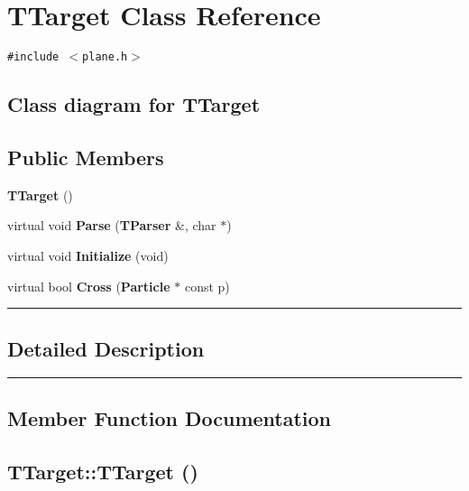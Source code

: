 \section{TTarget  Class Reference}
\label{TTarget}


{\tt \#include $<$plane.h$>$}

\subsection*{Class diagram for TTarget}
\begin{figure}[H]
\begin{center}
\leavevmode
\setlength{\epsfysize}{3cm}
\end{center}
\end{figure}
\subsection*{Public Members}
\begin{CompactItemize}
\item 
{\bf TTarget} ()
\item 
virtual void {\bf Parse} ({\bf TParser} \&, char $\ast$)
\item 
virtual void {\bf Initialize} (void)
\item 
virtual bool {\bf Cross} ({\bf Particle} $\ast$ const p)
\end{CompactItemize}
\vspace{0.4cm}\hrule\vspace{0.2cm}
\subsection*{Detailed Description}
\vspace{0.4cm}\hrule\vspace{0.2cm}
\subsection*{Member Function Documentation}
\label{TTarget_a0}
\subsection{\setlength{\rightskip}{0pt plus 5cm}TTarget::TTarget ()}

\label{TTarget_a1}
